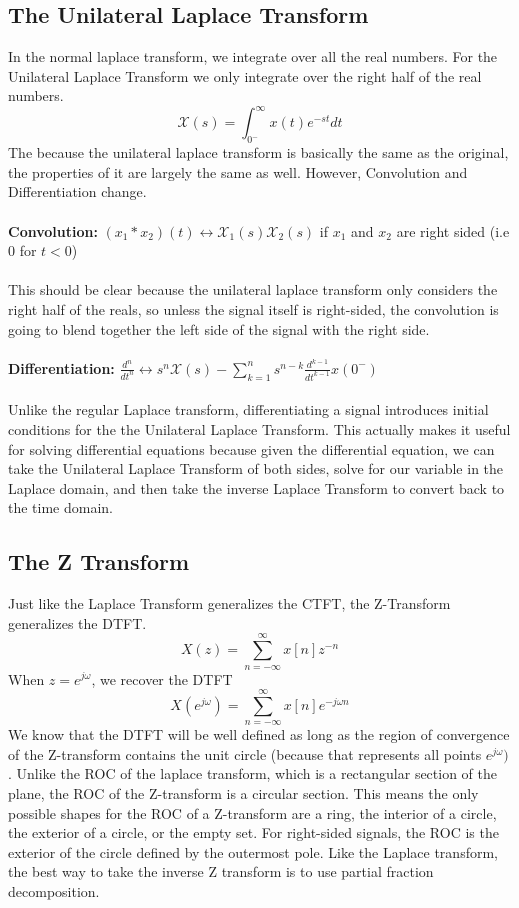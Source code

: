 \documentclass{article}
\begin{document}
\subsection{The Unilateral Laplace Transform}
In the normal laplace transform, we integrate over all the real numbers. For the Unilateral Laplace Transform
we only integrate over the right half of the real numbers.
$$\mathcal{X}(s)=\int_{0^-}^{\infty}{x(t)e^{-st}dt}$$
The because the unilateral laplace transform is basically the same as the original, the properties of it are largely the same as well.
However, Convolution and Differentiation change.\\\\
\textbf{Convolution:} $(x_1*x_2)(t) \leftrightarrow \mathcal{X}_1(s)\mathcal{X}_2(s)$ if $x_1$ and $x_2$ are right sided (i.e 0 for $t<0$)\\\\
This should be clear because the unilateral laplace transform only considers the right half of the reals, so unless the signal itself is right-sided,
the convolution is going to blend together the left side of the signal with the right side.\\\\
\textbf{Differentiation:} $\frac{d^n}{dt^n}\leftrightarrow s^n\mathcal{X}(s)-\sum_{k=1}^{n}{s^{n-k}\frac{d^{k-1}}{dt^{k-1}}x(0^-)}$\\\\
Unlike the regular Laplace transform, differentiating a signal introduces initial conditions for the the Unilateral Laplace Transform. This actually makes it useful
for solving differential equations because given the differential equation, we can take the Unilateral Laplace Transform of both sides, solve for our variable in the Laplace domain,
and then take the inverse Laplace Transform to convert back to the time domain.
\subsection{The Z Transform}
Just like the Laplace Transform generalizes the CTFT, the Z-Transform generalizes the DTFT.
$$X(z) = \sum_{n=-\infty}^{\infty}{x[n]z^{-n}}$$
When $z = e^{j\omega}$, we recover the DTFT
$$X(e^{j\omega})=\sum_{n=-\infty}^{\infty}{x[n]e^{-j\omega n}}$$
We know that the DTFT will be well defined as long as the region of convergence of the Z-transform contains the unit circle (because that represents all points $e^{j\omega})$.
Unlike the ROC of the laplace transform, which is a rectangular section of the plane, the ROC of the Z-transform is a circular section.
This means the only possible shapes for the ROC of a Z-transform are a ring, the interior of a circle, the exterior of a circle, or the empty set.
For right-sided signals, the ROC is the exterior of the circle defined by the outermost pole. Like the Laplace transform, the best way to take the inverse Z transform is to use partial fraction decomposition.
\end{document}
